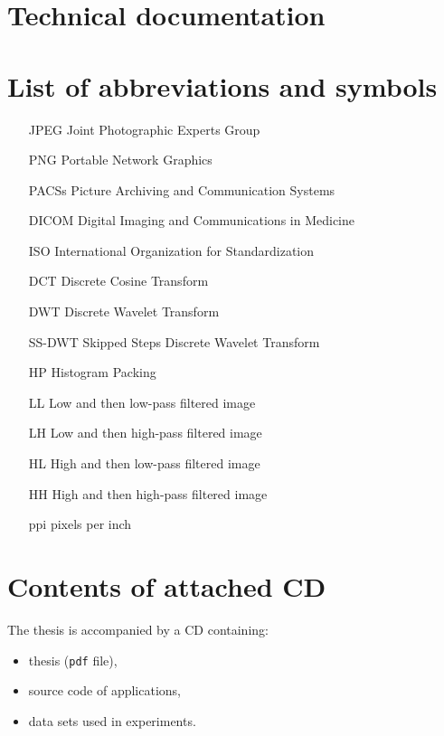 \chapter*{Technical documentation}

\chapter*{List of abbreviations and symbols}

\begin{itemize}
\item[JPEG] Joint Photographic Experts Group
\item[PNG] Portable Network Graphics
\item[PACSs] Picture Archiving and Communication Systems
\item[DICOM] Digital Imaging and Communications in Medicine
\item[ISO] International Organization for Standardization
\item[DCT] Discrete Cosine Transform
\item[DWT] Discrete Wavelet Transform
\item[SS-DWT] Skipped Steps Discrete Wavelet Transform
\item[HP] Histogram Packing
\item[LL] Low and then low-pass filtered image
\item[LH] Low and then high-pass filtered image
\item[HL] High and then low-pass filtered image
\item[HH] High and then high-pass filtered image
\item[ppi] pixels per inch
\end{itemize}

\chapter*{Contents of attached CD}

The thesis is accompanied by a CD containing:
\begin{itemize}
\item thesis (\texttt{pdf} file),
\item source code of applications,
\item data sets used in experiments.
\end{itemize}
